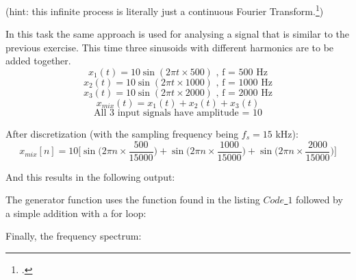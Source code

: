 (hint: this infinite process is literally just a continuous Fourier Transform.\footcite{book1_pp55_56})

In this task the same approach is used for analysing a signal that is similar to the previous exercise. This time three sinusoids with different harmonics are to be added together.
\[x_1(t) = 10\sin(2\pi t \times 500) \text{ , f = 500 Hz}\]
\[x_2(t) = 10\sin(2\pi t \times 1000) \text{ , f = 1000 Hz}\]
\[x_3(t) = 10\sin(2\pi t \times 2000) \text{ , f = 2000 Hz}\]
\[x_{mix}(t) = x_1(t) + x_2(t) + x_3(t)\]
\[\text{All 3 input signals have amplitude = 10}\]

After discretization (with the sampling frequency being $f_s = 15$ kHz):
\[x_{mix}[n] =10\bigg[\sin\Big(2\pi n \times \frac{500}{15000}\Big) + \sin\Big(2\pi n \times \frac{1000}{15000}\Big) + \sin\Big(2\pi n \times \frac{2000}{15000}\Big)\bigg]\]

And this results in the following output:

\newpage
The generator function uses the function found in the listing \underline{\textbf{$Code$ $1$}} followed by a simple addition with a for loop:


Finally, the frequency spectrum:

